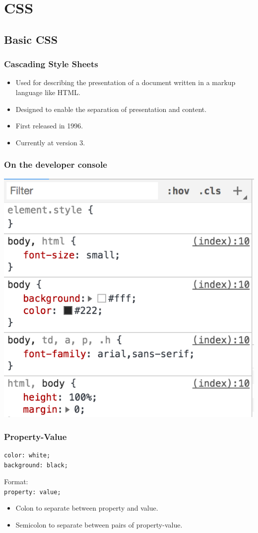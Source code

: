 \documentclass[12pt]{beamer}
\begin{document}
\section{CSS}
\subsection{Basic CSS}
\begin{frame}
\frametitle{Cascading Style Sheets}
\begin{itemize}
	\item Used for describing the presentation of a document written in a markup language like HTML.
	\item Designed to enable the separation of presentation and content.
	\item First released in 1996.
	\item Currently at version 3.
\end{itemize}
\end{frame}

\begin{frame}
\frametitle{On the developer console}
\begin{center}
	\includegraphics[width=0.7\linewidth]{css-devconsole}
\end{center}
\end{frame}

\begin{frame}[fragile]
\frametitle{Property-Value}
\begin{verbatim}
color: white;
background: black;
\end{verbatim}
Format:\\
\texttt{property: value;}
\begin{itemize}
	\item Colon to separate between property and value.
	\item Semicolon to separate between pairs of property-value.
\end{itemize}
\end{frame}
\end{document}
